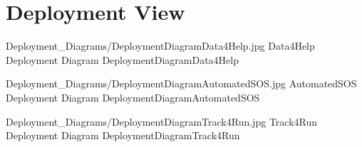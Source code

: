 \documentclass[../../DD.tex]{subfiles}
\begin{document}
\section{Deployment View}
	\image {13cm} {Deployment_Diagrams/DeploymentDiagramData4Help.jpg} {Data4Help Deployment Diagram} {DeploymentDiagramData4Help}

	\image {13cm} {Deployment_Diagrams/DeploymentDiagramAutomatedSOS.jpg} {AutomatedSOS Deployment Diagram} {DeploymentDiagramAutomatedSOS}

	\image {13cm} {Deployment_Diagrams/DeploymentDiagramTrack4Run.jpg} {Track4Run Deployment Diagram} {DeploymentDiagramTrack4Run}
	
\end{document}
